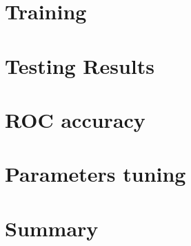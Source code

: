 \documentclass[english,12pt,oneside,a4paper]{article}
\begin{document}
\begin{center}
		\section{Training}
		
		\section{Testing Results}
		
		\section{ROC accuracy}
		
		\section{Parameters tuning}
		
		\section{Summary}
		

\end{center}
\end{document}
